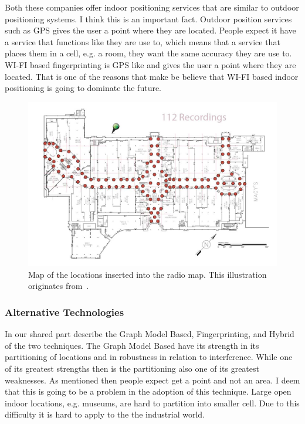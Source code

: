 Both these companies offer indoor positioning services that are similar to outdoor positioning systems.
I think this is an important fact.
Outdoor position services such as GPS gives the user a point where they are located.
People expect it have a service that functions like they are use to, which means that a service that places them in a cell, e.g. a room, they want the same accuracy they are use to.
WI-FI based fingerprinting is GPS like and gives the user a point where they are located.
That is one of the reasons that make be believe that WI-FI based indoor positioning is going to dominate the future.  
\begin{figure}%
\centering
\includegraphics[width=\columnwidth]{images/USA_Stonestown_Recordings-shrunk.jpg}%
\caption{Map of the locations inserted into the radio map. This illustration originates from~\cite{qubulus}.}%
\label{fig:qubulus}%
\end{figure}



\subsubsection{\qquad Alternative Technologies} 
In our shared part describe the Graph Model Based, Fingerprinting, and Hybrid of the two techniques.
The Graph Model Based have its strength in its partitioning of locations and in robustness in relation to interference.
While one of its greatest strengths then is the partitioning also one of its greatest weaknesses. 
As mentioned then people expect get a point and not an area.
I deem that this is going to be a problem in the adoption of this technique.  
Large open indoor locations, e.g. museums, are hard to partition into smaller cell.
Due to this difficulty it is hard to apply to the the industrial world.

